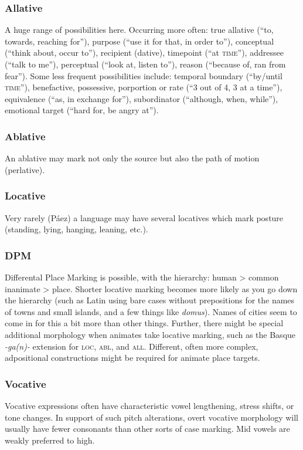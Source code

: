 \documentclass[11pt]{article}
\newcommand{\I}[1]{\textsc{#1}}   %
\begin{document}
\subsubsection{Allative} A huge range of possibilities here.
Occurring more often: true allative (``to, towards, reaching for''),
purpose (``use it for that, in order to''), conceptual (``think about,
occur to''), recipient (dative), timepoint (``at \I{time}''),
addressee (``talk to me''), perceptual (``look at, listen to''),
reason (``because of, ran from fear'').  Some less frequent
possibilities include: temporal boundary (``by/until \I{time}''),
benefactive, possessive, porportion or rate (``3 out of 4, 3 at a
time''), equivalence (``as, in exchange for''), subordinator
(``although, when, while''), emotional target (``hard for, be angry
at'').

\subsubsection{Ablative} An ablative may mark not only the source but
also the path of motion (perlative).

\subsubsection{Locative} Very rarely (Páez) a language may have
several locatives which mark posture (standing, lying, hanging,
leaning, etc.).

\subsubsection{DPM} Differental Place Marking is possible, with the
hierarchy: human > common inanimate > place.  Shorter locative marking
becomes more likely as you go down the hierarchy (such as Latin using
bare cases without prepositions for the names of towns and small
islands, and a few things like \textit{domus}).  Names of cities seem
to come in for this a bit more than other things.  Further, there
might be special additional morphology when animates take locative
marking, such as the Basque \textit{-ga(n)-} extension for \I{loc},
\I{abl}, and \I{all}.  Different, often more complex, adpositional
constructions might be required for animate place targets.

\subsubsection{Vocative} Vocative expressions often have
characteristic vowel lengthening, stress shifts, or tone changes.  In
support of such pitch alterations, overt vocative morphology will
usually have fewer consonants than other sorts of case marking.  Mid
vowels are weakly preferred to high.
\end{document}

